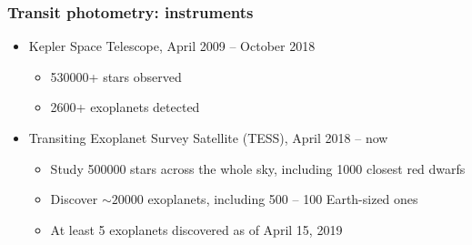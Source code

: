 \documentclass[aspectratio=169]{beamer}
\begin{document}
\begin{frame}
\frametitle{Transit photometry: instruments}
\begin{itemize}
\item
Kepler Space Telescope, April 2009 -- October 2018
\begin{itemize}
\item 530000+ stars observed
\item 2600+ exoplanets detected
\end{itemize}
\item
Transiting Exoplanet Survey Satellite (TESS), April 2018 -- now
\begin{itemize}
\item Study 500000 stars across the whole sky, including 1000 closest red dwarfs
\item Discover $\sim 20000$ exoplanets, including 500 -- 100 Earth-sized ones
\item At least 5 exoplanets discovered as of April 15, 2019
\end{itemize}
\end{itemize}

\end{frame}
\end{document}
